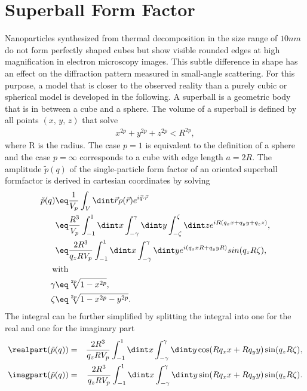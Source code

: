 \documentclass[\main/dresen_thesis.tex]{subfiles}
\begin{document}
\section{Superball Form Factor}\label{ch:appendix:numericalMethods:superballFormfactor}

Nanoparticles synthesized from thermal decomposition in the size range of $10 \unit{nm}$ do not form perfectly shaped cubes but show visible rounded edges at high magnification in electron microscopy images.
This subtle difference in shape has an effect on the diffraction pattern measured in small-angle scattering.
For this purpose, a model that is closer to the observed reality than a purely cubic or spherical model is developed in the following.
A superball is a geometric body that is in between a cube and a sphere. The volume of a superball is defined by all points $(x,\, y,\, z)$ that solve
\begin{align}
x^{2p} + y^{2p} + z^{2p} < R^{2p},
\end{align}
where R is the radius.  The case $p=1$ is equivalent to the definition of a sphere and the case $p=\infty$ corresponds to a cube with edge length $a=2R$.
The amplitude $\tilde{p}(q)$ of the single-particle form factor of an oriented superball formfactor is derived in cartesian coordinates by solving
\begin{align}
  \tilde{p}(q) \eq& \frac{1}{V_p} \int_{V} \dint \vec{r} \rho(\vec{r}) e^{i \vec{q} \cdot \vec{r}}\\
  \eq& \frac{R^3}{V_p} \int_{-1}^{1} \dint x \int_{-\gamma}^{\gamma} \dint y \int_{-\zeta}^{\zeta} \dint z  e^{iR(q_x x + q_y y + q_z z)},\\
  \eq& \frac{2R^3}{q_z R V_p} \int_{-1}^{1} \dint x \int_{-\gamma}^{\gamma} \dint y  e^{i (q_x x R + q_y y R)} sin(q_z R \zeta),\\
  \mathrm{with}\nonumber\\
  \gamma \eq& \sqrt[2p]{1-x^{2p}}, \\
  \zeta \eq& \sqrt[2p]{1-x^{2p} -y^{2p}}.
\end{align}
The integral can be further simplified by splitting the integral into one for the real and one for the imaginary part
\begin{align}
  \realpart (\tilde{p}(q)) &=& \frac{2R^3}{q_z R V_p} \int_{-1}^{1} \dint x \int_{-\gamma}^{\gamma} \dint y \cos(R q_x x + R q_y y)  \sin (q_z R \zeta),\\
  \imagpart (\tilde{p}(q)) &=& \frac{2R^3}{q_z R V_p} \int_{-1}^{1} \dint x \int_{-\gamma}^{\gamma} \dint y \sin(R q_x x + R q_y y) \sin (q_z R \zeta).
\end{align}
\end{document}
